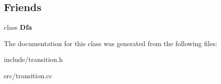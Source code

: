 \subsection*{Friends}
\begin{DoxyCompactItemize}
\item 
\mbox{\label{classTransition_a21ab7f6ff9e8704242e18ecfde24a901}} 
class {\bfseries Dfa}
\end{DoxyCompactItemize}


The documentation for this class was generated from the following files\+:\begin{DoxyCompactItemize}
\item 
include/transition.\+h\item 
src/transition.\+cc\end{DoxyCompactItemize}
